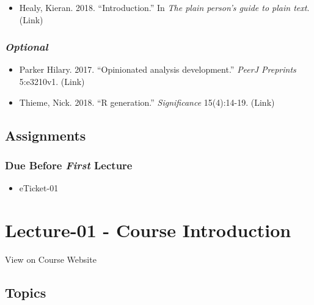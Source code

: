 \documentclass[]{book}
\providecommand{\tightlist}{%
  \setlength{\itemsep}{0pt}\setlength{\parskip}{0pt}}
\begin{document}
\begin{itemize}
\tightlist
\item
  Healy, Kieran. 2018. ``Introduction.'' In \emph{The plain person's guide to plain text}. (Link)
\end{itemize}

\hypertarget{optional}{%
\subsubsection*{\texorpdfstring{\emph{Optional}}{Optional}}\label{optional}}

\begin{itemize}
\tightlist
\item
  Parker Hilary. 2017. ``Opinionated analysis development.'' \emph{PeerJ Preprints} 5:e3210v1. (Link)
\item
  Thieme, Nick. 2018. ``R generation.'' \emph{Significance} 15(4):14-19. (Link)
\end{itemize}

\hypertarget{assignments-1}{%
\subsection*{Assignments}\label{assignments-1}}

\hypertarget{due-before-first-lecture}{%
\subsubsection*{\texorpdfstring{Due Before \emph{First} Lecture}{Due Before First Lecture}}\label{due-before-first-lecture}}

\begin{itemize}
\tightlist
\item
  eTicket-01
\end{itemize}

\hypertarget{lecture-01---course-introduction}{%
\section*{Lecture-01 - Course Introduction}\label{lecture-01---course-introduction}}

View on Course Website

\hypertarget{topics-1}{%
\subsection*{Topics}\label{topics-1}}
\end{document}
